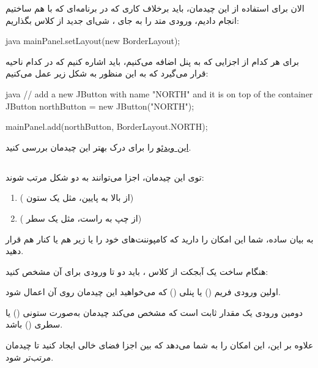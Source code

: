 الان برای استفاده از این چیدمان، باید برخلاف کاری که در برنامه‌ای که با
هم ساختیم انجام دادیم، ورودی متد  را به جای
، شی‌ای جدید از کلاس 
بگذاریم:

\begin{codebox}{java}
mainPanel.setLayout(new BorderLayout);
\end{codebox}

برای هر کدام از اجزایی که به پنل اضافه می‌کنیم، باید اشاره کنیم که در
کدام ناحیه قرار می‌گیرد که به این منظور به شکل زیر عمل می‌کنیم:

\begin{codebox}{java}
// add a new JButton with name "NORTH" and it is on top of the container JButton northButton = new JButton("NORTH"); 

mainPanel.add(northButton, BorderLayout.NORTH);
\end{codebox}

\href{https://www.youtube.com/watch?v=PD6pd6AMoOI}{این ویدئو} را برای
درک بهتر این چیدمان بررسی کنید.

\subsection{}

توی این چیدمان، اجزا می‌توانند به دو شکل مرتب شوند:

\begin{enumerate}
\def\labelenumi{\arabic{enumi}.}
\tightlist
\item
   ( از بالا به پایین، مثل یک ستون)
\item
   ( از چپ به راست، مثل یک سطر)
\end{enumerate}

به بیان ساده، شما این امکان را دارید که کامپوننت‌های خود را یا زیر هم یا
کنار هم قرار دهید.

هنگام ساخت یک آبجکت از کلاس  ، باید دو تا ورودی
برای آن مشخص کنید:

اولین ورودی فریم () یا پنلی ()
که می‌خواهید این چیدمان روی آن اعمال شود.

دومین ورودی یک مقدار ثابت است که مشخص می‌کند چیدمان به‌صورت ستونی
() یا سطری () باشد.

علاوه بر این،  این امکان را به شما می‌دهد که بین
اجزا فضای خالی ایجاد کنید تا چیدمان مرتب‌تر شود.


